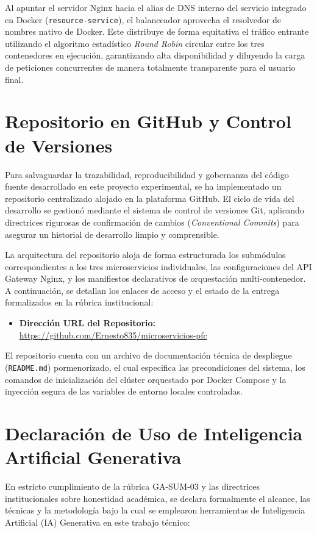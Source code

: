 \documentclass[12pt,journal,onecolumn]{IEEEtran}
\begin{document}
Al apuntar el servidor Nginx hacia el alias de DNS interno del servicio integrado en Docker (\texttt{resource-service}), el balanceador aprovecha el resolvedor de nombres nativo de Docker. Este distribuye de forma equitativa el tráfico entrante utilizando el algoritmo estadístico \textit{Round Robin} circular entre los tres contenedores en ejecución, garantizando alta disponibilidad y diluyendo la carga de peticiones concurrentes de manera totalmente transparente para el usuario final.

\newpage

\section{\textbf{Repositorio en GitHub y Control de Versiones}}
Para salvaguardar la trazabilidad, reproducibilidad y gobernanza del código fuente desarrollado en este proyecto experimental, se ha implementado un repositorio centralizado alojado en la plataforma GitHub. El ciclo de vida del desarrollo se gestionó mediante el sistema de control de versiones Git, aplicando directrices rigurosas de confirmación de cambios (\textit{Conventional Commits}) para asegurar un historial de desarrollo limpio y comprensible.

La arquitectura del repositorio aloja de forma estructurada los submódulos correspondientes a los tres microservicios individuales, las configuraciones del API Gateway Nginx, y los manifiestos declarativos de orquestación multi-contenedor. A continuación, se detallan los enlaces de acceso y el estado de la entrega formalizados en la rúbrica institucional:

\begin{itemize}
    \item \textbf{Dirección URL del Repositorio:} \url{https://github.com/Ernesto835/microservicios-pfc}
\end{itemize}

El repositorio cuenta con un archivo de documentación técnica de despliegue (\texttt{README.md}) pormenorizado, el cual especifica las precondiciones del sistema, los comandos de inicialización del clúster orquestado por Docker Compose y la inyección segura de las variables de entorno locales controladas.

\newpage

\section{\textbf{Declaración de Uso de Inteligencia Artificial Generativa}}
En estricto cumplimiento de la rúbrica GA-SUM-03 y las directrices institucionales sobre honestidad académica, se declara formalmente el alcance, las técnicas y la metodología bajo la cual se emplearon herramientas de Inteligencia Artificial (IA) Generativa en este trabajo técnico:
\end{document}
